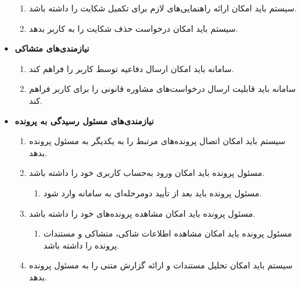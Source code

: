 \documentclass[12pt,a4paper,oneside]{article}
\begin{document}
\begin{itemize}
\begin{enumerate}
        \item 
        سیستم باید امکان ارائه راهنمایی‌های لازم برای تکمیل شکایت را داشته باشد.

        \item 
        سیستم باید امکان درخواست حذف شکایت را به کاربر بدهد.
    \end{enumerate}

    \item
    \textbf{نیازمندی‌های متشاکی}
    \begin{enumerate}
        \renewcommand{\labelenumi}{\textbf{.R\arabic{enumi}}}
        \setcounter{enumi}{21}

        \item 
        سامانه باید امکان ارسال دفاعیه توسط کاربر را فراهم کند.

        \item 
        سامانه باید قابلیت ارسال درخواست‌های مشاوره قانونی را برای کاربر فراهم کند.
    \end{enumerate}

    \item
    \textbf{نیازمندی‌های مسئول رسیدگی به پرونده}
    \begin{enumerate}
        \renewcommand{\labelenumi}{\textbf{.R\arabic{enumi}}}
        \setcounter{enumi}{23}

        \item 
        سیستم باید امکان اتصال پرونده‌های مرتبط را به یکدیگر به مسئول پرونده بدهد.

        \item 
        مسئول پرونده باید امکان ورود به‌حساب کاربری خود را داشته باشد.
        \begin{enumerate}
            \renewcommand{\labelenumii}{\textbf{.R\arabic{enumi}.\arabic{enumii}}}
            \item 
            مسئول پرونده باید بعد از تأیید دومرحله‌ای به سامانه وارد شود.
        \end{enumerate}

        \item 
        مسئول پرونده باید امکان مشاهده پرونده‌های خود را داشته باشد.
        \begin{enumerate}
            \renewcommand{\labelenumii}{\textbf{.R\arabic{enumi}.\arabic{enumii}}}
            \item 
            مسئول پرونده باید امکان مشاهده اطلاعات شاکی، متشاکی و مستندات پرونده را داشته باشد.
        \end{enumerate}

        \item 
        سیستم باید امکان تحلیل مستندات و ارائه گزارش متنی را به مسئول پرونده بدهد.


\end{enumerate}
\end{itemize}
\end{document}
